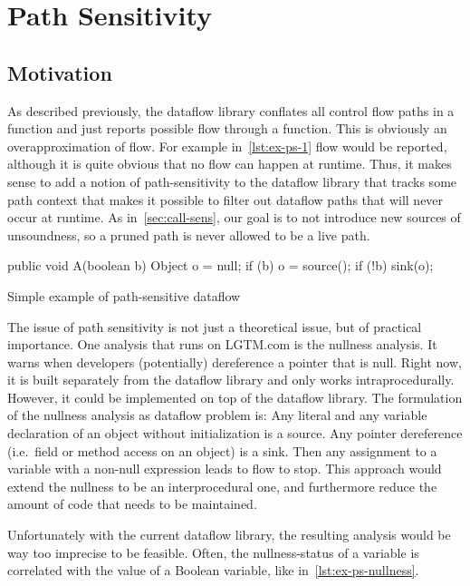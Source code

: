 \section{Path Sensitivity}
\subsection{Motivation}

As described previously, the dataflow library conflates all control flow paths 
in a function and just reports possible flow through a function.
This is obviously an overapproximation of flow.
For example in~\autoref{lst:ex-ps-1} flow would be reported,
although it is quite obvious that no flow can happen at runtime.
Thus, it makes sense to add a notion of path-sensitivity to the dataflow library
that tracks some path context that makes it possible to filter out dataflow paths 
that will never occur at runtime.
As in~\autoref{sec:call-sens}, our goal is to not introduce new sources of 
unsoundness, so a pruned path is never allowed to be a live path.

\begin{listing}
    \begin{javacode}
public void A(boolean b) {
    Object o = null;
    if (b) {
        o = source();
    }
    if (!b) {
        sink(o);
    }
}
    \end{javacode}
    \caption{Simple example of path-sensitive dataflow}
    \label{lst:ex-ps-1}
\end{listing}

The issue of path sensitivity is not just a theoretical issue, but of practical importance.
One analysis that runs on LGTM.com is the nullness analysis.
It warns when developers (potentially) dereference a pointer that is null.
Right now, it is built separately from the dataflow library and only works 
intraprocedurally.
However, it could be implemented on top of the dataflow library.
The formulation of the nullness analysis as dataflow problem is:
Any literal  and any variable declaration of an object 
without initialization is a source.
Any pointer dereference (i.e.\ field or method access on an object) is a sink.
Then any assignment to a variable with a non-null expression leads to flow to stop.
This approach would extend the nullness to be an interprocedural one, and furthermore 
reduce the amount of code that needs to be maintained.

Unfortunately with the current dataflow library, the resulting analysis would 
be way too imprecise to be feasible.
Often, the nullness-status of a variable is correlated with the value of a Boolean 
variable, like in~\autoref{lst:ex-ps-nullness}.

